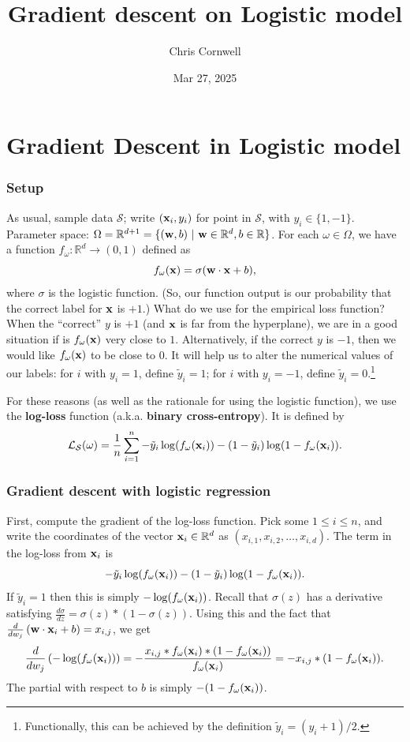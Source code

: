 \documentclass{beamer}
\author{Chris Cornwell}
\date{Mar 27, 2025}
\title{Gradient descent on Logistic model}
\theoremstyle{example}
\begin{document}
\begin{frame}
\titlepage
\end{frame}

\section {Gradient Descent in Logistic model}

\begin{frame}
\frametitle{Setup}
    As usual, sample data $\mathcal S$; write $({\bf x}_i, y_i)$ for point in $\mathcal S$, with $y_i\in\{1, -1\}$. \newline 
    Parameter space: $\Omega = \mathbb R^{d+1} = \{({\bf w},b)\ |\ {\bf w}\in\mathbb R^d, b\in\mathbb R\}$. For each $\omega \in \Omega$, we have a function $f_{\omega}:\mathbb R^d\to(0,1)$ defined as 
            \[f_{\omega}({\bf x}) = \sigma({\bf w}\cdot{\bf x} + b),\]
    where $\sigma$ is the logistic function. (So, our function output is our probability that the correct label for ${\bf x}$ is $+1$.)
\pause
What do we use for the empirical loss function? When the ``correct'' $y$ is $+1$ (and ${\bf x}$ is far from the hyperplane), we are in a good situation if is $f_{\omega}({\bf x})$ very close to $1$. Alternatively, if the correct $y$ is $-1$, then we would like $f_{\omega}({\bf x})$ to be close to $0$.\newline 
It will help us to alter the numerical values of our labels: for $i$ with $y_i=1$, define $\tilde y_i = 1$; for $i$ with $y_i=-1$, define $\tilde y_i = 0$.\footnote{Functionally, this can be achieved by the definition $\tilde y_i = (y_i+1)/2$.}

\pause 
For these reasons (as well as the rationale for using the logistic function), we use the \textbf{log-loss} function (a.k.a. \textbf{binary cross-entropy}). It is defined by 
    \[\mathcal L_{\mathcal S}(\omega) = \frac{1}{n}\sum_{i=1}^n -\tilde y_i\log(f_{\omega}({\bf x}_i)) - (1-\tilde y_i)\log(1 - f_{\omega}({\bf x}_i)) .\]
\end{frame}

\begin{frame}
\frametitle{Gradient descent with logistic regression}
First, compute the gradient of the log-loss function. Pick some $1\le i\le n$, and write the coordinates of the vector ${\bf x}_i\in\mathbb R^d$ as $(x_{i,1},x_{i,2},\ldots,x_{i,d})$. The term in the log-loss from ${\bf x}_i$ is 
        \[-\tilde y_i\log(f_{\omega}({\bf x}_i)) - (1-\tilde y_i)\log(1 - f_{\omega}({\bf x}_i)).\]
If $\tilde y_i = 1$ then this is simply $-\log(f_{\omega}({\bf x}_i))$. Recall that $\sigma(z)$ has a derivative satisfying $\frac{d\sigma}{dz} = \sigma(z)\ast(1 - \sigma(z))$. Using this and the fact that $\frac{d}{dw_j}\left({\bf w}\cdot{\bf x}_i + b\right) = x_{i,j}$, we get 
        \[\frac{d}{dw_j}\left( -\log(f_{\omega}({\bf x}_i)) \right) = - \frac{x_{i,j}\ast f_{\omega}({\bf x}_i)\ast(1 - f_{\omega}({\bf x}_i))}{f_{\omega}({\bf x}_i)} = -x_{i,j}\ast(1-f_{\omega}({\bf x}_i)).\]
The partial with respect to $b$ is simply $-(1-f_{\omega}({\bf x}_i))$.

\end{frame}
\end{document}
